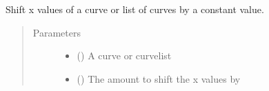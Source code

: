 \documentclass[letterpaper,10pt,english]{sphinxmanual}
\begin{document}
\begin{fulllineitems}
\label{\detokenize{pydv:pydvpy.dx}}
Shift x values of a curve or list of curves by a constant value.

\begin{sphinxVerbatim}[commandchars=\\\{\}]
  
\end{sphinxVerbatim}

\begin{sphinxVerbatim}[commandchars=\\\{\}]
  
\end{sphinxVerbatim}

\begin{sphinxVerbatim}[commandchars=\\\{\}]
\PYG{p}{[}\PYG{p}{]} 
\end{sphinxVerbatim}
\begin{quote}\begin{description}
\item[{Parameters}] \leavevmode\begin{itemize}
\item {} 
 ({\hyperref[\detokenize{pydv:curve.Curve}]{}}) \textendash{} A curve or curvelist

\item {} 
 () \textendash{} The amount to shift the x values by

\end{itemize}

\end{description}\end{quote}

\end{fulllineitems}
\end{document}
